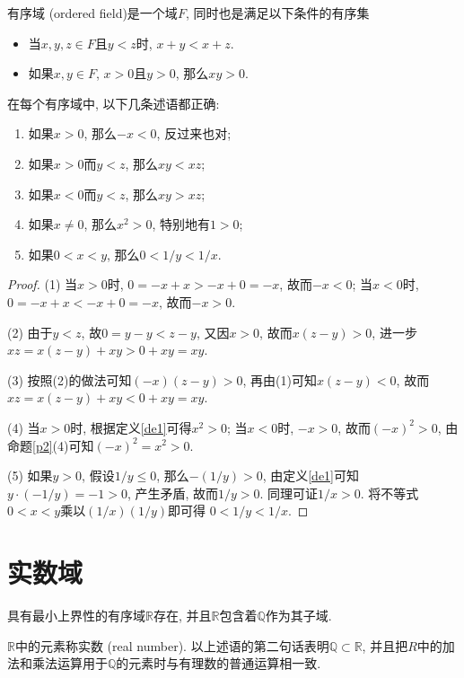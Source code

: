 \documentclass[cn,12pt,math=mtpro2,citestyle=gb7714-2015,bibstyle=gb7714-2015,twocol]{elegantbook}
\newcommand{\R}{\mathbb{R}}
\newcommand{\Q}{\mathbb{Q}}
\begin{document}
\begin{definition}\label{de1}
有序域 (ordered field)是一个域$F$, 同时也是满足以下条件的有序集
\begin{itemize}
\item 当$x, y, z\in F$且$y<z$时, $x+y<x+z$.

\item 如果$x, y \in F$, $x>0$且$y>0$, 那么$xy>0$.
\end{itemize}
\end{definition}
\begin{proposition}
在每个有序域中, 以下几条述语都正确:
\begin{enumerate}[label=(\arabic*)]
\item 如果$x>0$, 那么$-x<0$, 反过来也对;
\item 如果$x>0$而$y<z$, 那么$xy<xz$;
\item 如果$x<0$而$y<z$, 那么$xy>xz$;
\item 如果$x\neq 0$, 那么$x^2>0$, 特别地有$1>0$;
\item 如果$0<x<y$, 那么$0<1/y<1/x$.
\end{enumerate}
\end{proposition}
\begin{proof}
  (1) 当$x>0$时, $0=-x+x>-x+0=-x$, 故而$-x<0$; 当$x<0$时, $0=-x+x<-x+0=-x$, 故而$-x>0$.

  (2) 由于$y<z$, 故$0=y-y<z-y$, 又因$x>0$, 故而$x(z-y)>0$, 进一步$xz=x(z-y)+xy>0+xy=xy$.

  (3) 按照(2)的做法可知$(-x)(z-y)>0$, 再由(1)可知$x(z-y)<0$, 故而$xz=x(z-y)+xy<0+xy=xy$.

  (4) 当$x>0$时, 根据定义\ref{de1}可得$x^2>0$; 当$x<0$时, $-x>0$, 故而$(-x)^2>0$, 由命题\ref{p2}(4)可知$(-x)^2=x^2>0$.

  (5) 如果$y>0$, 假设$1/y\leq 0$, 那么$-(1/y)>0$, 由定义\ref{de1}可知$y\cdot(-1/y)=-1>0$, 产生矛盾, 故而$1/y>0$. 同理可证$1/x>0$. 将不等式$0<x<y$乘以$(1/x) (1/y)$即可得
  $0<1/y<1/x$.


\end{proof}

\section{实数域}
\begin{theorem}[确界存在原理]\label{thm:th0}
  具有最小上界性的有序域$\R$存在, 并且$\R$包含着$\Q$作为其子域.
\end{theorem}

$\R$中的元素称实数 (real number). 以上述语的第二句话表明$\Q\subset \R$, 并且把$R$中的加法和乘法运算用于$\Q$的元素时与有理数的普通运算相一致.
\end{document}
